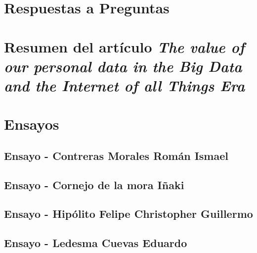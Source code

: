 \documentclass[11pt,letterpaper,spanish]{article}
\newcommand{\integranteUno}{Contreras Morales Román Ismael}
\newcommand{\integranteDos}{Cornejo de la mora Iñaki}
\newcommand{\integranteTres}{Hipólito Felipe Christopher Guillermo}
\newcommand{\integranteCuatro}{Ledesma Cuevas Eduardo}
\begin{document}
\section*{Respuestas a Preguntas}

\begin{enumerate}[label=\alph*., leftmargin=*]
	
	
	
	
	
	
	
	
	
	
\end{enumerate}

\section*{Resumen del artículo \textit{The value of our personal data in the Big Data and the Internet of all Things Era}}



\section*{Ensayos}

\subsection*{Ensayo - \integranteUno}


\subsection*{Ensayo - \integranteDos}


\subsection*{Ensayo - \integranteTres}


\subsection*{Ensayo - \integranteCuatro}




\printbibliography
\end{document}
